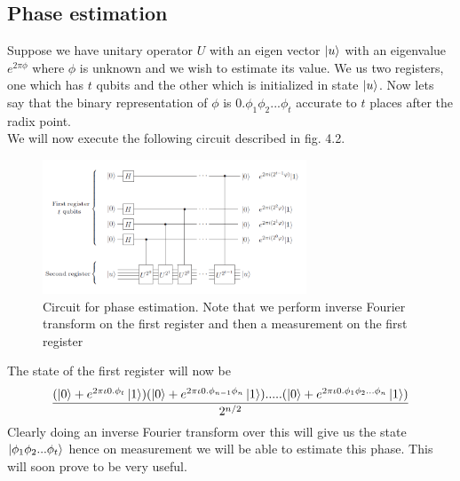 \documentclass{report}
\begin{document}
\subsection{Phase estimation}
Suppose we have unitary operator $U$ with an eigen vector $\ket{u}$ with an eigenvalue $e^{2\pi\phi}$ where $\phi$ is unknown and we wish to estimate its value. We us two registers, one which has $t$ qubits and the other which is initialized in state $\ket{u}$. Now lets say that the binary representation of $\phi$ is $0.\phi_1\phi_2...\phi_t$ accurate to $t$ places after the radix point.\\
We will now execute the following circuit described in fig. 4.2.
\begin{figure}[ht]
    \centering
    \includegraphics[width = 0.7\textwidth]{images/phase estimation.png}
    \caption{Circuit for phase estimation. Note that we perform inverse Fourier transform on the first register and then a measurement on the first register}
\end{figure}
The state of the first register will now be
$$\dfrac{(\ket{0} + e^{2\pi\iota0.\phi_t}\ket{1})(\ket{0} + e^{2\pi\iota0.\phi_{n-1}\phi_{n}}\ket{1}).....(\ket{0} + e^{2\pi\iota0.\phi_{1}\phi_{2}...\phi_{n}}\ket{1})}{2^{n/2}}$$
Clearly doing an inverse Fourier transform over this will give us the state $\ket{\phi_1\phi_2...\phi_t}$ hence on measurement we will be able to estimate this phase. This will soon prove to be very useful.
\end{document}
